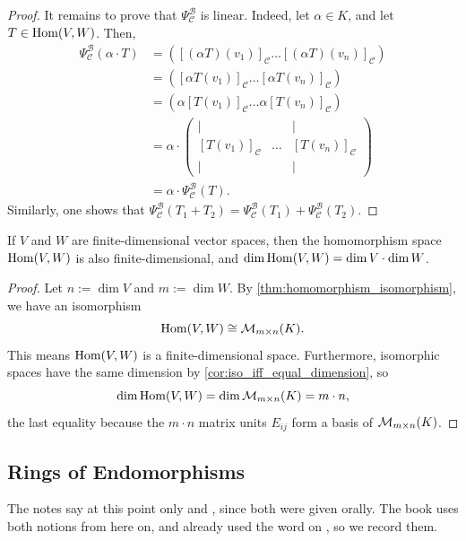 \begin{proof}
  It remains to prove that $\Psi_{\mathcal{C}}^{\mathcal{B}}$ is linear. Indeed, let $\alpha \in K$, and let $T \in \operatorname{Hom}(V,W)$. Then,
  \begin{align*}
    \Psi_{\mathcal{C}}^{\mathcal{B}}(\alpha \cdot T) &= \left( [(\alpha T)(v_1)]_{\mathcal{C}} \dots [(\alpha T)(v_n)]_{\mathcal{C}} \right) \\
    &= \left( [\alpha T(v_1)]_{\mathcal{C}} \dots [\alpha T(v_n)]_{\mathcal{C}} \right) \\
    &= \left( \alpha [T(v_1)]_{\mathcal{C}} \dots \alpha [T(v_n)]_{\mathcal{C}} \right) \\
    &= \alpha \cdot \begin{pmatrix} | & & | \\ [T(v_1)]_{\mathcal{C}} & \dots & [T(v_n)]_{\mathcal{C}} \\ | & & | \end{pmatrix} \\
    &= \alpha \cdot \Psi_{\mathcal{C}}^{\mathcal{B}}(T).
  \end{align*}
  Similarly, one shows that $\Psi_{\mathcal{C}}^{\mathcal{B}}(T_1 + T_2) = \Psi_{\mathcal{C}}^{\mathcal{B}}(T_1) + \Psi_{\mathcal{C}}^{\mathcal{B}}(T_2)$.
\end{proof}

\begin{corollary}
  \label{cor:dim_hom}
  If $V$ and $W$ are finite-di\-men\-sional vector spaces, then the homomorphism space $\operatorname{Hom}(V,W)$ is also finite-di\-men\-sional, and $\dim \operatorname{Hom}(V,W) = \dim V \cdot \dim W$.
\end{corollary}

\begin{proof}
  Let $n := \dim V$ and $m := \dim W$. By \cref{thm:homomorphism_isomorphism}, we have an isomorphism
  \[
  \operatorname{Hom}(V,W) \cong \mathcal{M}_{m \times n}(K).
  \]
  This means $\operatorname{Hom}(V,W)$ is a finite-dimensional space. Furthermore, isomorphic spaces have the same dimension by \cref{cor:iso_iff_equal_dimension}, so
  \[
  \dim \operatorname{Hom}(V,W) = \dim \mathcal{M}_{m \times n}(K) = m \cdot n,
  \]
  the last equality because the $m \cdot n$ matrix units $E_{ij}$ form a basis of $\mathcal{M}_{m \times n}(K)$.
\end{proof}

\subsection{Rings of Endomorphisms}

The notes say at this point only 
and , since both were given orally.
The book uses both notions from here on, and already used the word
 on , so we record them.

